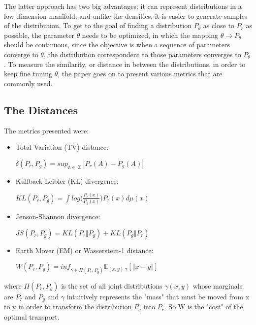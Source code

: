 The latter approach has two big advantages: it can represent distributions in a low dimension manifold, and unlike the densities, it is easier to generate samples of the distribution. To get to the goal of finding a distribution  $P_{\theta}$ as close to $P_{r}$ as possible, the parameter $\theta$ needs to be optimized, in which the mapping $\theta \rightarrow P_{\theta}$ should be continuous, since the objective is when a sequence of parameters converge to $\theta$, the distribution correspondent to those parameters converges to $P_{\theta}$. To measure the similarity, or distance in between the distributions, in order to keep fine tuning $\theta$, the paper goes on to present various metrics that are commonly used. 

\subsection{The Distances}
The metrics presented were:
\begin{itemize}
	\item Total Variation (TV) distance:
	\begin{center}
		$\delta(P_{r}, P_{g}) = sup_{\mathbb{A \in \sum}}|P_{r}(A)-P_{g}(A)| $
	\end{center}
	\item Kullback-Leibler (KL) divergence:
	\begin{center}
		$KL(P_{r}, P_{g}) = \int log \Big(\frac{P_{r}(x)}{P_{g}(x)}\Big) P_{r}(x) d\mu(x) $
	\end{center}
	\item Jenson-Shannon divergence:
	\begin{center}
		$ JS(P_{r}, P_{g}) = KL(P_{r} \Vert P_{g}) + KL(P_{g} \Vert P_{r}) $
	\end{center}
	\item Earth Mover (EM) or Wasserstein-1 distance:
	\begin{center}
		$ W(P_{r}, P_{g}) = inf_{\gamma \in \Pi(P_{r},P_{g})} \mathbb{E}_{(x,y)~\gamma}[\Vert x - y \Vert]$
	\end{center}
	
\end{itemize}

where $\Pi(P_{r}, P_{g})$ is the set of all joint distributions $\gamma(x,y)$ whose marginals are $P_{r}$ and $P_{g}$ and $\gamma$ intuitively represents the "mass" that must be moved from x to y in order to transform the distribution  $P_{g}$ into $P_{r}$. So W is the "cost" of the optimal transport.

